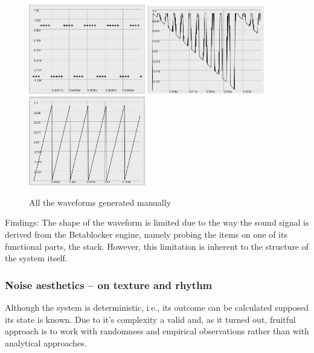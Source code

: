 \documentclass[letterpaper, 12pt]{article}
\begin{document}
\begin{figure}
		\includegraphics[width=2in]{wv-pulse22}
		\includegraphics[width=2in]{wv-sawImpulse}
		\includegraphics[width=2in]{wv-sawtooth}
	\caption{All the waveforms generated manually}
	\label{fig:fig_waveforms_POPdestroy-random}
\end{figure}


Findings: The shape of the waveform is limited due to the way the sound signal is derived from the Betablocker engine, namely probing the items on one of its functional parts, the stack. 
However, this limitation is inherent to the structure of the system itself.



\subsubsection{Noise aesthetics -- on texture and rhythm} 
\label{sub:noise_aesthetics}

Although the system is deterministic, i.e., its outcome can be calculated supposed its state is known.
Due to it's complexity a valid and, as it turned out, fruitful approach is to work with randomness and empirical observations rather than with analytical approaches.
\end{document}
